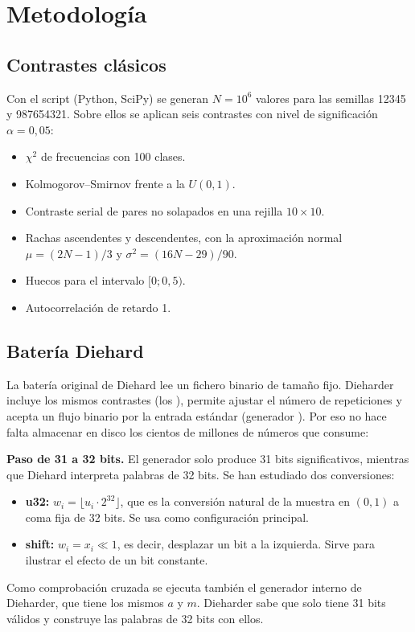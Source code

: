 \documentclass[a4paper,11pt]{article}
\begin{document}
\section{Metodología}\label{sec:metodologia}

\subsection{Contrastes clásicos}

Con el script  (Python, SciPy) se generan
$N = 10^6$ valores para las semillas 12345 y 987654321. Sobre ellos se aplican
seis contrastes con nivel de significación $\alpha = 0{,}05$:
\begin{itemize}
  \item $\chi^2$ de frecuencias con 100 clases.
  \item Kolmogorov--Smirnov frente a la $U(0,1)$.
  \item Contraste serial de pares no solapados en una rejilla $10\times10$.
  \item Rachas ascendentes y descendentes, con la aproximación normal
        $\mu = (2N-1)/3$ y $\sigma^2 = (16N-29)/90$.
  \item Huecos para el intervalo $[0; 0{,}5)$.
  \item Autocorrelación de retardo 1.
\end{itemize}

\subsection{Batería Diehard}

La batería original de Diehard lee un fichero binario de tamaño fijo. Dieharder
incluye los mismos contrastes (los ), permite ajustar el número
de repeticiones y acepta un flujo binario por la entrada estándar (generador
). Por eso no hace falta almacenar en disco los cientos de
millones de números que consume:
\begin{center}
\end{center}

\textbf{Paso de 31 a 32 bits.} El generador solo produce 31 bits
significativos, mientras que Diehard interpreta palabras de 32 bits. Se han
estudiado dos conversiones:
\begin{itemize}
  \item \textbf{u32:} $w_i = \lfloor u_i \cdot 2^{32} \rfloor$, que es la
        conversión natural de la muestra en $(0,1)$ a coma fija de 32 bits.
        Se usa como configuración principal.
  \item \textbf{shift:} $w_i = x_i \ll 1$, es decir, desplazar un bit a la
        izquierda. Sirve para ilustrar el efecto de un bit constante.
\end{itemize}
Como comprobación cruzada se ejecuta también el generador 
interno de Dieharder, que tiene los mismos $a$ y $m$. Dieharder sabe que solo
tiene 31 bits válidos y construye las palabras de 32 bits con ellos.
\end{document}
